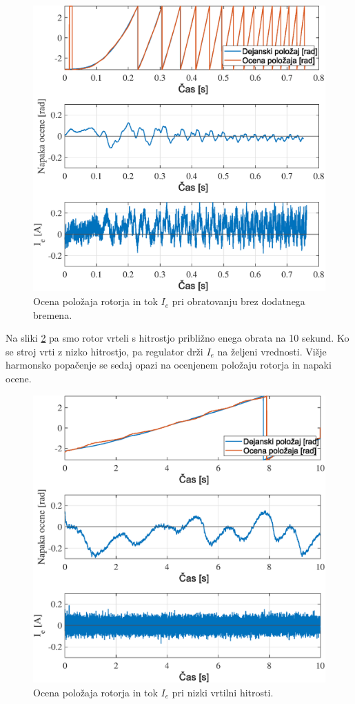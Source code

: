 \documentclass[a4paper,twoside,openright,12pt,slovene]{book}
\begin{document}
\begin{figure}[!htbp]
    \centering
    \includegraphics[width=0.8\columnwidth]{Slike/NoLoadRun.eps}
    \caption{\label{NoLoadRun} Ocena položaja rotorja in tok $I_e$ pri obratovanju brez dodatnega bremena. }
\end{figure}

\newpage

Na sliki \ref{HighLoadRun} pa smo rotor vrteli s hitrostjo približno enega obrata na 10 sekund. Ko se stroj vrti z nizko hitrostjo, pa regulator drži $I_e$ na željeni vrednosti. Višje harmonsko
popačenje se sedaj opazi na ocenjenem položaju rotorja in napaki ocene. 

\begin{figure}[!htbp]
    \centering
    \includegraphics[width=0.8\columnwidth]{Slike/HighLoadRun.eps}
    \caption{\label{HighLoadRun} Ocena položaja rotorja in tok $I_e$ pri nizki vrtilni hitrosti. }
\end{figure}
\end{document}
